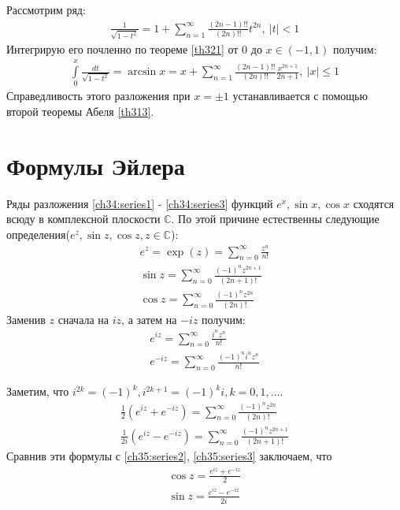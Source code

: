 \begin{itemize}
    Рассмотрим ряд:
    \begin{gather}
      \frac{1}{\sqrt{1 - t^2}} = 1 + \sum\limits_{n = 1}^{\infty}
      \frac{(2n-1)!!}{(2n)!!}t^{2n}, \ |t| < 1
    \end{gather}
    Интегрирую его почленно по теореме \eqref{th321} от $0$ до $x \in (-1, 1)$
    получим:
    \begin{gather*}
      \int\limits_0^x \frac{dt}{\sqrt{1-t^2}} = \arcsin x = x + \sum\limits_{n
      = 1}^{\infty} \frac{(2n-1)!!}{(2n)!!} \frac{x^{2n+1}}{2n+1}, \ |x| \leq 1
    \end{gather*}
    Справедливость этого разложения при $x = \pm 1$ устанавливается с помощью
    второй теоремы Абеля \eqref{th313}.
\end{itemize}

\section{Формулы Эйлера}
Ряды разложения \eqref{ch34:series1} - \eqref{ch34:series3} функций $e^x, \sin x,
\cos x$ сходятся всюду в комплексной плоскости $\mathbb{C}$. По этой причине
естественны следующие определения($e^z, \sin z, \cos z, z \in \mathbb{C}$):
\begin{gather}
  e^z = \exp(z) = \sum\limits_{n = 0}^{\infty} \frac{z^n}{n!}
  \label{ch35:series1} \\
  \sin z = \sum\limits_{n = 0}^{\infty} \frac{(-1)^n z^{2n+1}}{(2n+1)!}
  \label{ch35:series2} \\
  \cos z = \sum\limits_{n = 0}^{\infty} \frac{(-1)^n z^{2n}}{(2n)!}
  \label{ch35:series3}
\end{gather}
Заменив $z$ сначала на $iz$, а затем на $-iz$ получим:
\begin{gather}\label{ch35:series4}
  e^{iz} = \sum\limits_{n = 0}^{\infty} \frac{i^n z^n}{n!} \\
  e^{-iz} = \sum\limits_{n = 0}^{\infty} \frac{(-1)^n i^n z^n}{n!}
\end{gather}

Заметим, что $i^{2k} = (-1)^k, i^{2k + 1} = (-1)^ki, k = 0, 1, \dots$. \\
\begin{gather*}
  \frac{1}{2} (e^{iz} + e^{-iz}) = \sum\limits_{n = 0}^{\infty} \frac{(-1)^n
  z^{2n}}{(2n)!} \\
  \frac{1}{2i} (e^{iz} - e^{-iz}) = \sum\limits_{n = 0}^{\infty}
  \frac{(-1)^n z^{2n+1}}{(2n+1)!}
\end{gather*}
Сравнив эти формулы с \eqref{ch35:series2}, \eqref{ch35:series3} заключаем, что
\begin{gather}
  \cos z = \frac{e^{iz} + e^{-iz}}{2}
  \label{ch35:eq1} \\
  \sin z = \frac{e^{iz} - e^{-iz}}{2i}
  \label{ch35:eq2}
\end{gather}


